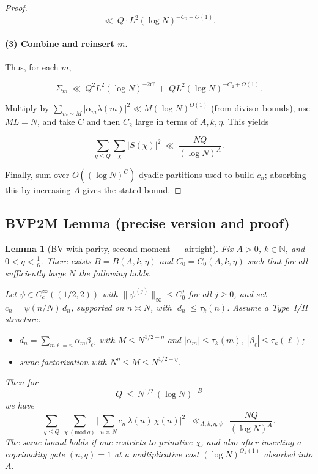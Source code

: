 \documentclass[11pt]{article}
\newtheorem{lemma}{Lemma}[part]
\theoremstyle{definition}
\theoremstyle{remark}
\numberwithin{equation}{part}
\begin{document}
\begin{proof}
	$$
		\ll\ Q\cdot L^2 (\log N)^{-C_2+O(1)}.
	$$

	\paragraph{(3) Combine and reinsert $m$.}
	Thus, for each $m$,

	$$
		\Sigma_m\ \ll\ Q^2 L^2 (\log N)^{-2C} \ +\ Q L^2 (\log N)^{-C_2+O(1)}.
	$$

	Multiply by $\sum_{m\sim M}|\alpha_m\lambda(m)|^2\ll M(\log N)^{O(1)}$ (from divisor bounds), use $ML=N$, and take $C$ and then $C_2$ large in terms of $A,k,\eta$. This yields

	$$
		\sum_{q\le Q}\sum_{\chi}|S(\chi)|^2\ \ll\ \frac{NQ}{(\log N)^A}.
	$$

	Finally, sum over $O((\log N)^C)$ dyadic partitions used to build $c_n$; absorbing this by increasing $A$ gives the stated bound.
\end{proof}

\subsection{BVP2M Lemma (precise version and proof)}

\begin{lemma}[BV with parity, second moment — airtight]\label{lem:BV-parity-airtight}
	Fix $A>0$, $k\in\mathbb N$, and $0<\eta<\tfrac16$. There exists $B=B(A,k,\eta)$ and $C_0=C_0(A,k,\eta)$ such that for all sufficiently large $N$ the following holds.

	Let $\psi\in C_c^\infty((1/2,2))$ with $\|\psi^{(j)}\|_\infty\le C_0^{j}$ for all $j\ge0$, and set $c_n=\psi(n/N)\,d_n$, supported on $n\asymp N$, with $|d_n|\le \tau_k(n)$. Assume a Type~I/II structure:
	\begin{itemize}
		\item[\emph{Type I:}] $d_n=\sum_{m\ell=n}\alpha_m\beta_\ell$, with $M\le N^{1/2-\eta}$ and $|\alpha_m|\le \tau_k(m)$, $|\beta_\ell|\le \tau_k(\ell)$;
		\item[\emph{Type II:}] same factorization with $N^{\eta}\le M\le N^{1/2-\eta}$.
	\end{itemize}
	Then for
	\[
		Q\ \le\ N^{1/2}\,(\log N)^{-B}
	\]
	we have
	\[
		\sum_{q\le Q}\ \sum_{\chi\ (\mathrm{mod}\ q)}
		\Bigg|\sum_{n\asymp N} c_n\,\lambda(n)\,\chi(n)\Bigg|^2
		\ \ \ll_{A,k,\eta,\psi}\ \ \frac{NQ}{(\log N)^{A}}.
	\]
	The same bound holds if one restricts to primitive $\chi$, and also after inserting a coprimality gate $(n,q)=1$ at a multiplicative cost $(\log N)^{O_k(1)}$ absorbed into $A$.
\end{lemma}
\end{document}
